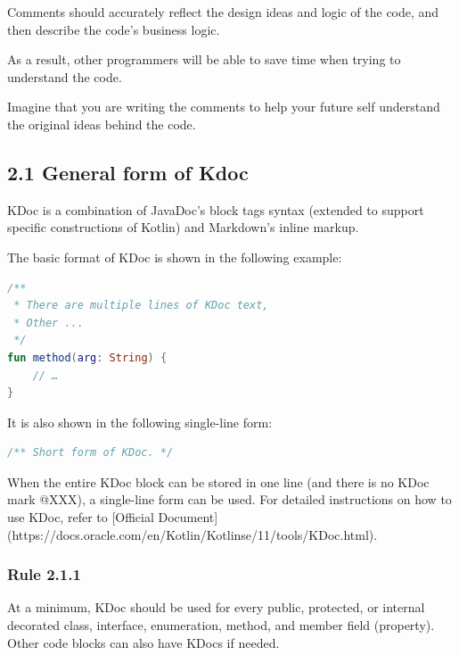 Comments should accurately reflect the design ideas and logic of the code, and then describe the code's business logic.

As a result, other programmers will be able to save time when trying to understand the code.

Imagine that you are writing the comments to help your future self understand the original ideas behind the code.



\subsection*{\textbf{2.1 General form of Kdoc}}



KDoc is a combination of JavaDoc's block tags syntax (extended to support specific constructions of Kotlin) and Markdown's inline markup.

The basic format of KDoc is shown in the following example:



\begin{lstlisting}[language=Kotlin]
 /**
 * There are multiple lines of KDoc text,
 * Other ...
 */
fun method(arg: String) {
    // …
}
\end{lstlisting}


It is also shown in the following single-line form:



\begin{lstlisting}[language=Kotlin]
 /** Short form of KDoc. */
\end{lstlisting}
When the entire KDoc block can be stored in one line (and there is no KDoc mark @XXX), a single-line form can be used. For detailed instructions on how to use KDoc, refer to [Official Document](https://docs.oracle.com/en/Kotlin/Kotlinse/11/tools/KDoc.html).



\subsubsection*{\textbf{Rule 2.1.1}}
\leavevmode\newline



At a minimum, KDoc should be used for every public, protected, or internal decorated class, interface, enumeration, method, and member field (property). Other code blocks can also have KDocs if needed.



